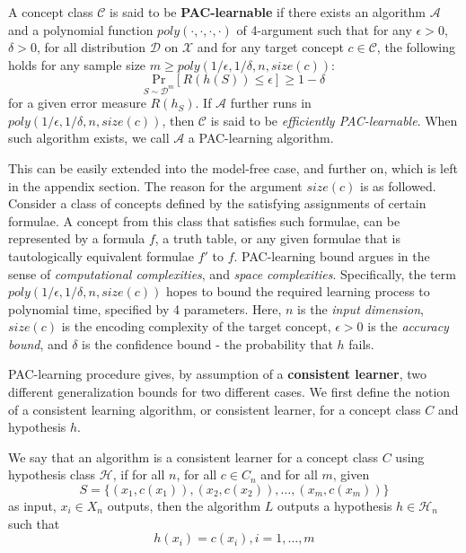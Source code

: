 \documentclass{article}
\begin{document}
\begin{definition}
    A concept class $\mathcal{C}$ is said to be \textbf{PAC-learnable} if there exists an algorithm $\mathcal{A}$ and a polynomial function $poly(\cdot,\cdot,\cdot,\cdot)$ of 4-argument such that for any $\epsilon>0$, $\delta>0$, for all distribution $\mathcal{D}$ on $\mathcal{X}$ and for any target concept $c\in\mathcal{C}$, the following holds for any sample size $m\geq poly(1/\epsilon,1/\delta,n,size(c))$: $$\underset{S\sim \mathcal{D}^{m}}{\mathrm{Pr}}\left[ R(h(S))\leq \epsilon \right]\geq 1-\delta$$
    for a given error measure $R(h_{S})$. If $\mathcal{A}$ further runs in $poly(1/\epsilon,1/\delta,n,size(c))$, then $\mathcal{C}$ is said to be \textit{efficiently PAC-learnable}. When such algorithm exists, we call $\mathcal{A}$ a PAC-learning algorithm. 
\end{definition}
This can be easily extended into the model-free case, and further on, which is left in the appendix section. The reason for the argument $size(c)$ is as followed. Consider a class of concepts defined by the satisfying assignments of certain formulae. A concept from this class that satisfies such formulae, can be represented by a formula $f$, a truth table, or any given formulae that is tautologically equivalent formulae $f'$ to $f$. PAC-learning bound argues in the sense of \textit{computational complexities}, and \textit{space complexities}. Specifically, the term $poly(1/\epsilon,1/\delta,n,size(c))$ hopes to bound the required learning process to polynomial time, specified by 4 parameters. Here, $n$ is the \textit{input dimension}, $size(c)$ is the encoding complexity of the target concept, $\epsilon>0$ is the \textit{accuracy bound}, and $\delta$ is the confidence bound - the probability that $h$ fails.

PAC-learning procedure gives, by assumption of a \textbf{consistent learner}, two different generalization bounds for two different cases. We first define the notion of a consistent learning algorithm, or consistent learner, for a concept class $C$ and hypothesis $h$. 
\begin{definition}
    We say that an algorithm is a consistent learner for a concept class $C$ using hypothesis class $\mathcal{H}$, if for all $n$, for all $c\in C_n$ and for all $m$, given 
    \begin{equation*}
        S = \{ (x_1, c(x_1)) , (x_2, c(x_2)) ,\dots, (x_m, c(x_m))  \} 
    \end{equation*}
    as input, $x_i \in X_n$ outputs, then the algorithm $L$ outputs a hypothesis $h\in \mathcal{H}_n$ such that $$h(x_i) = c(x_i) , i = 1,\dots,m$$ 
\end{definition}
\end{document}
